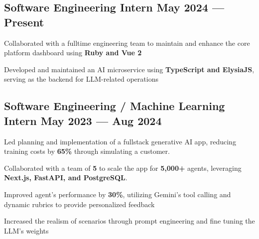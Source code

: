 
\subsection{{Software Engineering Intern \hfill May 2024 --- Present}}
\begin{zitemize}
    \item Collaborated with a fulltime engineering team to maintain and enhance the core platform dashboard using \textbf{Ruby and Vue 2}  
    \item Developed and maintained an AI microservice using \textbf{TypeScript and ElysiaJS}, serving as the backend for LLM-related operations
\end{zitemize}


\subsection{{Software Engineering / Machine Learning Intern \hfill May 2023 --- Aug 2024}}
\begin{zitemize}
    \item Led planning and implementation of a fullstack generative AI app, reducing training costs by \textbf{65\%} through simulating a customer.
    \item Collaborated with a team of \textbf{5} to scale the app for \textbf{5,000+} agents, leveraging \textbf{Next.js, FastAPI, and PostgreSQL}.
    \item Improved agent's performance by \textbf{30\%}, utilizing Gemini's tool calling and dynamic rubrics to provide personalized feedback
    \item Increased the realism of scenarios through prompt engineering and fine tuning the LLM's weights
\end{zitemize}


